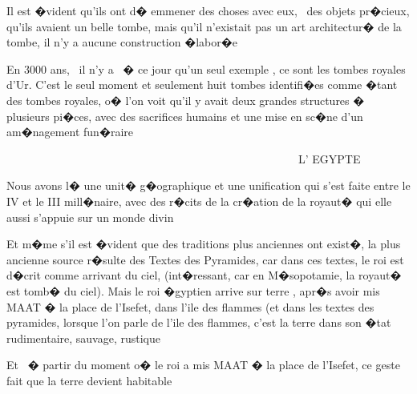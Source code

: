 \documentclass{article}
\begin{document}
Il est �vident qu'ils ont d� emmener des choses avec eux, \ des objets pr�cieux, qu'ils avaient un belle tombe, mais qu'il n'existait pas un art architectur� de la tombe, il n'y a aucune construction �labor�e

En 3000 ans, \ il n'y a \ � ce jour qu'un seul exemple , ce sont les tombes royales d'Ur. C'est le seul moment et seulement huit tombes identifi�es comme �tant des tombes royales, o� l'on voit qu'il y avait deux grandes structures � plusieurs pi�ces, avec des sacrifices humains et une mise en sc�ne d'un am�nagement fun�raire


\bigskip


\bigskip


\bigskip


\bigskip


\bigskip


\bigskip


\bigskip


\bigskip


\bigskip


\bigskip


\bigskip


\bigskip


\bigskip


\bigskip


\bigskip


\bigskip


\bigskip

\ \ \ \ \ \ \ \ \ \ \ \ \ \ \ \ \ \ \ \ \ \ \ \ \ \ \ \ \ \ \ \ \ \ \ \ \ \ \ \ \ \ \ \ \ \ \ \ \ \ \ \ L' EGYPTE


\bigskip


\bigskip

Nous avons l� une unit� g�ographique et une unification qui s'est faite entre le IV et le III mill�naire, avec des r�cits de la cr�ation de la royaut� qui elle aussi s'appuie sur un monde divin

Et m�me s'il est �vident que des traditions plus anciennes ont exist�, la plus ancienne source r�sulte des Textes des Pyramides, car dans ces textes, le roi est d�crit comme arrivant du ciel, (int�ressant, car en M�sopotamie, la royaut� est tomb� du ciel). Mais le roi �gyptien arrive sur terre , apr�s avoir mis MAAT � la place de l'Isefet, dans l'ile des flammes (et dans les textes des pyramides, lorsque l'on parle de l'ile des flammes, c'est la terre dans son �tat rudimentaire, sauvage, rustique

Et \ � partir du moment o� le roi a mis MAAT � la place de l'Isefet, ce geste fait que la terre devient habitable
\end{document}
